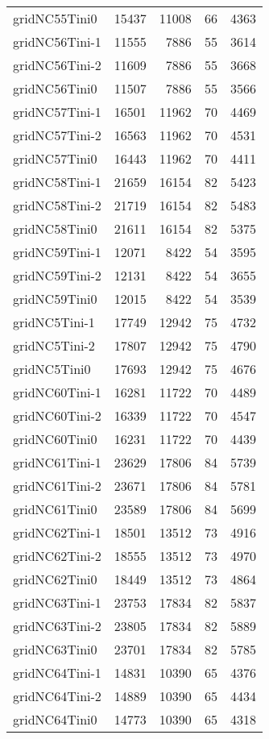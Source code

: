 \begin{longtable}{lrrrr}
gridNC55Tini0 & 15437 & 11008 & 66 & 4363 \\
gridNC56Tini-1 & 11555 & 7886 & 55 & 3614 \\
gridNC56Tini-2 & 11609 & 7886 & 55 & 3668 \\
gridNC56Tini0 & 11507 & 7886 & 55 & 3566 \\
gridNC57Tini-1 & 16501 & 11962 & 70 & 4469 \\
gridNC57Tini-2 & 16563 & 11962 & 70 & 4531 \\
gridNC57Tini0 & 16443 & 11962 & 70 & 4411 \\
gridNC58Tini-1 & 21659 & 16154 & 82 & 5423 \\
gridNC58Tini-2 & 21719 & 16154 & 82 & 5483 \\
gridNC58Tini0 & 21611 & 16154 & 82 & 5375 \\
gridNC59Tini-1 & 12071 & 8422 & 54 & 3595 \\
gridNC59Tini-2 & 12131 & 8422 & 54 & 3655 \\
gridNC59Tini0 & 12015 & 8422 & 54 & 3539 \\
gridNC5Tini-1 & 17749 & 12942 & 75 & 4732 \\
gridNC5Tini-2 & 17807 & 12942 & 75 & 4790 \\
gridNC5Tini0 & 17693 & 12942 & 75 & 4676 \\
gridNC60Tini-1 & 16281 & 11722 & 70 & 4489 \\
gridNC60Tini-2 & 16339 & 11722 & 70 & 4547 \\
gridNC60Tini0 & 16231 & 11722 & 70 & 4439 \\
gridNC61Tini-1 & 23629 & 17806 & 84 & 5739 \\
gridNC61Tini-2 & 23671 & 17806 & 84 & 5781 \\
gridNC61Tini0 & 23589 & 17806 & 84 & 5699 \\
gridNC62Tini-1 & 18501 & 13512 & 73 & 4916 \\
gridNC62Tini-2 & 18555 & 13512 & 73 & 4970 \\
gridNC62Tini0 & 18449 & 13512 & 73 & 4864 \\
gridNC63Tini-1 & 23753 & 17834 & 82 & 5837 \\
gridNC63Tini-2 & 23805 & 17834 & 82 & 5889 \\
gridNC63Tini0 & 23701 & 17834 & 82 & 5785 \\
gridNC64Tini-1 & 14831 & 10390 & 65 & 4376 \\
gridNC64Tini-2 & 14889 & 10390 & 65 & 4434 \\
gridNC64Tini0 & 14773 & 10390 & 65 & 4318 \\

\end{longtable}
